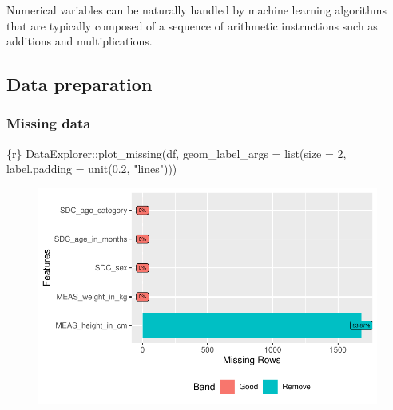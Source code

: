 \documentclass[
  letterpaper,
  DIV=11,
  numbers=noendperiod,
  oneside]{scrreprt}
\newenvironment{Shaded}{\begin{snugshade}}{\end{snugshade}}
\newcommand{\AttributeTok}[1]{\textcolor[rgb]{0.40,0.45,0.13}{#1}}
\newcommand{\DecValTok}[1]{\textcolor[rgb]{0.68,0.00,0.00}{#1}}
\newcommand{\FloatTok}[1]{\textcolor[rgb]{0.68,0.00,0.00}{#1}}
\newcommand{\FunctionTok}[1]{\textcolor[rgb]{0.28,0.35,0.67}{#1}}
\newcommand{\InformationTok}[1]{\textcolor[rgb]{0.37,0.37,0.37}{#1}}
\newcommand{\NormalTok}[1]{\textcolor[rgb]{0.00,0.23,0.31}{#1}}
\newcommand{\SpecialCharTok}[1]{\textcolor[rgb]{0.37,0.37,0.37}{#1}}
\newcommand{\StringTok}[1]{\textcolor[rgb]{0.13,0.47,0.30}{#1}}
\begin{document}
Numerical variables can be naturally handled by machine learning
algorithms that are typically composed of a sequence of arithmetic
instructions such as additions and multiplications.

\hypertarget{data-preparation-1}{%
\subsection{Data preparation}\label{data-preparation-1}}

\hypertarget{missing-data}{%
\subsubsection{Missing data}\label{missing-data}}

\begin{Shaded}
\begin{Highlighting}[]
\InformationTok{\textasciigrave{}\textasciigrave{}\textasciigrave{}\{r\}}
\NormalTok{DataExplorer}\SpecialCharTok{::}\FunctionTok{plot\_missing}\NormalTok{(df,}
                           \AttributeTok{geom\_label\_args =} \FunctionTok{list}\NormalTok{(}\AttributeTok{size =} \DecValTok{2}\NormalTok{, }\AttributeTok{label.padding =} \FunctionTok{unit}\NormalTok{(}\FloatTok{0.2}\NormalTok{, }\StringTok{"lines"}\NormalTok{)))}
\InformationTok{\textasciigrave{}\textasciigrave{}\textasciigrave{}}
\end{Highlighting}
\end{Shaded}

\begin{figure}[H]

{\centering \includegraphics{ds4ph_day3_session01_practical_session_files/figure-pdf/unnamed-chunk-6-1.pdf}

}

\end{figure}
\end{document}
